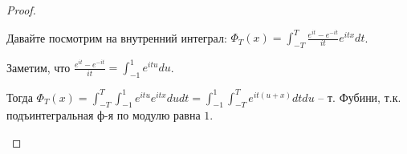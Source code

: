 \begin{proof}
\begin{enumerate}
{            Давайте посмотрим на внутренний интеграл: $\Phi_{T}(x) = \int_{-T}^{T} \frac{e^{it} - e^{-it}}{it} e^{it x} dt$.

            Заметим, что $\frac{e^{it} - e^{-it}}{it} = \int_{-1}^{1} e^{i t u} du$.

            Тогда $\Phi_{T}(x) = \int_{-T}^{T} \int_{-1}^{1} e^{i t u} e^{i t x} du dt = \int_{-1}^{1} \int_{-T}^{T} e^{i t (u + x)} dt du$ -- т. Фубини, т.к. подъинтегральная ф-я по модулю равна $1$.


        }
    \end{enumerate}













\end{proof}
